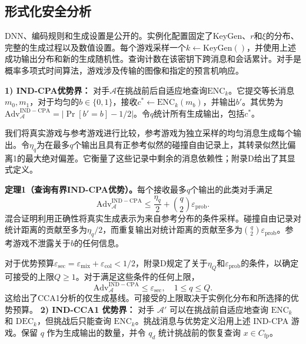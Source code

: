 \subsection{形式化安全分析}

DNN、编码规则和生成设置是公开的。实例化配置固定了KeyGen、\(r\)和\(\xi\)的分布、完整的生成过程以及数值设置。每个游戏采样一个\(k \leftarrow \mathrm{KeyGen}()\)，并使用上述成功输出分布和新的生成随机性。查询计数在该密钥下跨消息和会话累计。对手是概率多项式时间算法，游戏涉及传输的图像和指定的预言机响应。

\textbf{1) IND-CPA优势界：} 对手\(\mathcal{A}\)在挑战前后自适应地查询\(\mathrm{ENC}_k\)。它提交等长消息\(m_0, m_1\)，对于均匀的\(b \in \{0,1\}\)，接收\(c^* \leftarrow \mathrm{ENC}_k(m_b)\)，并输出\(b'\)。其优势为\(\mathrm{Adv}_{\mathcal{A}}^{\mathrm{IND-CPA}} = |\Pr[b' = b] - 1/2|\)。令\(q\)统计所有生成输出，包括\(c^*\)。

我们将真实游戏与参考游戏进行比较，参考游戏为独立采样的均匀消息生成每个输出。令\(\eta_q\)为在最多\(q\)个输出且具有正参考似然的碰撞自由记录上，其转录似然比偏离1的最大绝对偏差。它衡量了这些记录中剩余的消息依赖性；附录D给出了其显式定义。

\textbf{定理1（查询有界IND-CPA优势）。}每个接收最多\(q\)个输出的此类对手满足
\begin{equation}
\mathrm{Adv}_{\mathcal{A}}^{\mathrm{IND-CPA}} \le \frac{\eta_q}{2} + \binom{q}{2} \varepsilon_{\mathrm{prob}}. \tag{17}
\end{equation}
混合证明利用正确性将真实生成表示为来自参考分布的条件采样。碰撞自由记录对统计距离的贡献至多为\(\eta_q/2\)，而重复输出对统计距离的贡献至多为\(\binom{q}{2}\varepsilon_{\mathrm{prob}}\)。参考游戏不泄露关于\(b\)的任何信息。

对于优势预算\(\varepsilon_{\mathrm{sec}} = \varepsilon_{\mathrm{mix}} + \varepsilon_{\mathrm{col}} < 1/2\)，附录D规定了关于\(\eta_Q\)和\(\varepsilon_{\mathrm{prob}}\)的条件，以确定可接受的上限\(Q \ge 1\)。对于满足这些条件的任何上限，
\begin{equation}
\mathrm{Adv}_{\mathcal{A}}^{\mathrm{IND-CPA}} \le \varepsilon_{\mathrm{sec}}, \quad 1 \le q \le Q. \tag{18}
\end{equation}
这给出了CCA1分析的仅生成基线。可接受的上限取决于实例化分布和所选择的优势预算。
\textbf{2) IND-CCA1 优势界：} 对手 \(\mathcal{A}'\) 可以在挑战前自适应地查询 \(\mathrm{ENC}_k\) 和 \(\mathrm{DEC}_k\)，但挑战后只能查询 \(\mathrm{ENC}_k\)。挑战消息与优势定义沿用上述 IND-CPA 游戏。保留 \(q\) 作为生成输出的数量，并令 \(q_d\) 统计挑战前的恢复查询 \(x \in C_{\mathrm{fp}}\)。

